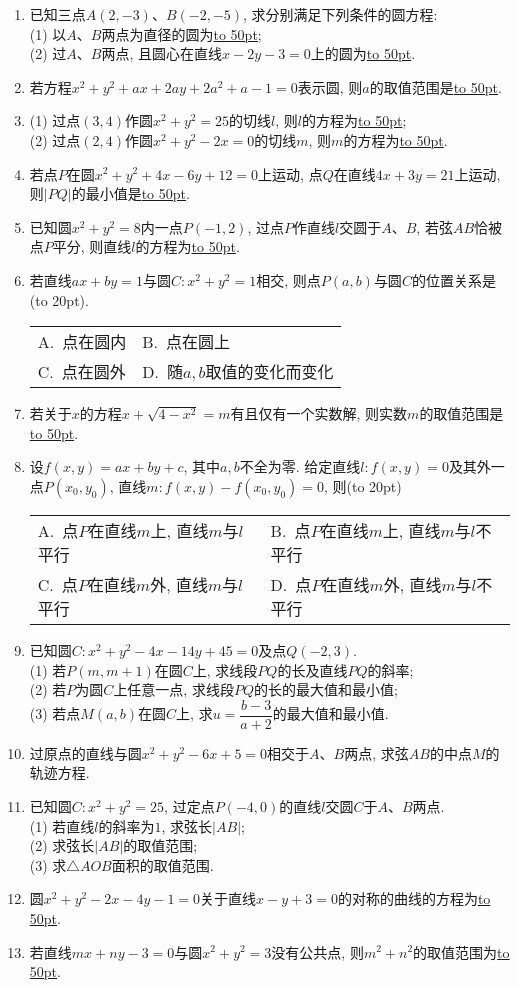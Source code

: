 \documentclass[10pt,a4paper]{article}
\newcommand{\blank}[1]{\underline{\hbox to #1pt{}}}
\newcommand{\bracket}[1]{(\hbox to #1pt{})}
\newcommand{\twoch}[4]{\par\begin{tabular}{p{.46\textwidth}p{.46\textwidth}}
A.~#1& B.~#2\\
C.~#3& D.~#4
\end{tabular}}
\begin{document}
\begin{enumerate}[1.]
\item 已知三点$A(2,-3)$、$B(-2,-5)$, 求分别满足下列条件的圆方程:\\
(1) 以$A$、$B$两点为直径的圆为\blank{50};\\
(2) 过$A$、$B$两点, 且圆心在直线$x-2y-3=0$上的圆为\blank{50}.
\item 若方程$x^2+y^2+ax+2ay+2a^2+a-1=0$表示圆, 则$a$的取值范围是\blank{50}.
\item (1) 过点$(3,4)$作圆$x^2+y^2=25$的切线$l$, 则$l$的方程为\blank{50};\\
(2) 过点$(2,4)$作圆$x^2+y^2-2x=0$的切线$m$, 则$m$的方程为\blank{50}.
\item 若点$P$在圆$x^2+y^2+4x-6y+12=0$上运动, 点$Q$在直线$4x+3y=21$上运动, 则$|PQ|$的最小值是\blank{50}.
\item 已知圆$x^2+y^2=8$内一点$P(-1,2)$, 过点$P$作直线$l$交圆于$A$、$B$, 若弦$AB$恰被点$P$平分, 则直线$l$的方程为\blank{50}.
\item 若直线$ax+by=1$与圆$C:x^2+y^2=1$相交, 则点$P(a,b)$与圆$C$的位置关系是\bracket{20}.
\twoch{点在圆内}{点在圆上}{点在圆外}{随$a,b$取值的变化而变化}
\item 若关于$x$的方程$x+\sqrt{4-x^2}=m$有且仅有一个实数解, 则实数$m$的取值范围是\blank{50}.
\item 设$f(x,y)=ax+by+c$, 其中$a,b$不全为零. 给定直线$l:f(x,y)=0$及其外一点$P(x_0,y_0)$, 直线$m:f(x,y)-f(x_0,y_0)=0$, 则\bracket{20}
\twoch{点$P$在直线$m$上, 直线$m$与$l$平行}{点$P$在直线$m$上, 直线$m$与$l$不平行}{点$P$在直线$m$外, 直线$m$与$l$平行}{点$P$在直线$m$外, 直线$m$与$l$不平行}
\item 已知圆$C:x^2+y^2-4x-14y+45=0$及点$Q(-2,3)$.\\
(1) 若$P(m,m+1)$在圆$C$上, 求线段$PQ$的长及直线$PQ$的斜率;\\
(2) 若$P$为圆$C$上任意一点, 求线段$PQ$的长的最大值和最小值;\\
(3) 若点$M(a,b)$在圆$C$上, 求$u=\dfrac{b-3}{a+2}$的最大值和最小值.
\item 过原点的直线与圆$x^2+y^2-6x+5=0$相交于$A$、$B$两点, 求弦$AB$的中点$M$的轨迹方程.
\item 已知圆$C:x^2+y^2=25$, 过定点$P(-4,0)$的直线$l$交圆$C$于$A$、$B$两点.\\
(1) 若直线$l$的斜率为$1$, 求弦长$|AB|$;\\
(2) 求弦长$|AB|$的取值范围;\\
(3) 求$\triangle AOB$面积的取值范围.
\item 圆$x^2+y^2-2x-4y-1=0$关于直线$x-y+3=0$的对称的曲线的方程为\blank{50}.
\item 若直线$mx+ny-3=0$与圆$x^2+y^2=3$没有公共点, 则$m^2+n^2$的取值范围为\blank{50}.

\end{enumerate}
\end{document}
